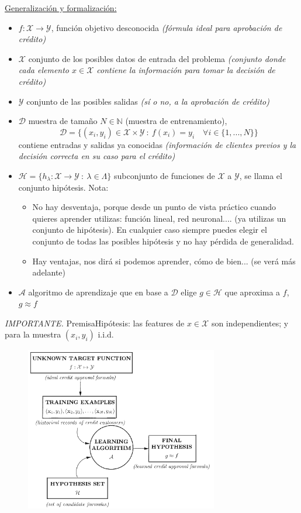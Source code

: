 \documentclass[11pt,a4paper]{article}
\theoremstyle{definition}
\newcommand{\N}{\mathbb{N}}
\begin{document}
		\underline{Generalización y formalización:}
		\begin{itemize}
			\item $f\colon \mathcal{X} \to \mathcal{Y}$, función objetivo desconocida \textit{(fórmula ideal para aprobación de crédito)}
			\item $\mathcal{X}$ conjunto de los posibles datos de entrada del problema \textit{(conjunto donde cada elemento $x\in \mathcal{X}$ contiene la información para tomar la decisión de crédito)}
			\item $\mathcal{Y}$ conjunto de las posibles salidas \textit{(sí o no, a la aprobación de crédito)}
			\item $\mathcal{D}$ muestra de tamaño $N\in \N$ (muestra de entrenamiento), $$\mathcal{D}=\{(x_i,y_i)\in \mathcal{X}\times \mathcal{Y} \ : \ f(x_i)=y_i \quad \forall i\in \{1,...,N\}\}$$ contiene entradas y salidas ya conocidas \textit{(información de clientes previos y la decisión correcta en su caso para el crédito)}
			\item $\mathcal{H}=\{h_\lambda\colon \mathcal{X} \to \mathcal{Y} \ : \ \lambda \in \Lambda\}$ subconjunto de funciones de $\mathcal{X}$ a $\mathcal{Y}$, se llama el conjunto hipótesis. Nota:
			\begin{itemize}
				\item No hay desventaja, porque desde un punto de vista práctico cuando quieres aprender utilizas: función lineal, red neuronal.... (ya utilizas un conjunto de hipótesis). En cualquier caso siempre puedes elegir el conjunto de todas las posibles hipótesis y no hay pérdida de generalidad.
				\item Hay ventajas, nos dirá si podemos aprender, cómo de bien... (se verá más adelante)
			\end{itemize}
			\item $\mathcal{A}$ algoritmo de aprendizaje que en base a $\mathcal{D}$ elige $g\in \mathcal{H}$ que aproxima a $f$, $g\approx f$
		\end{itemize}
		
		\textit{IMPORTANTE.} Premisa\/Hipótesis: las features de $x\in \mathcal{X}$ son independientes; y para la muestra $(x_i,y_i)$ i.i.d. 
		\newpage
	\begin{figure}[h!]
	\centering
	\includegraphics[width=0.75\textwidth]{images/esquema_aprendizaje}
	\end{figure}
	
\end{document}
